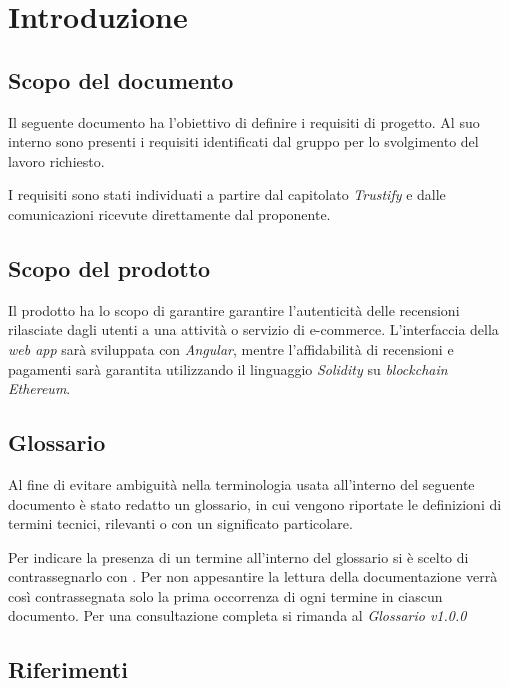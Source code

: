\section{Introduzione}


\subsection{Scopo del documento}
Il seguente documento ha l'obiettivo di definire i requisiti di progetto. Al suo interno sono presenti i requisiti
identificati dal gruppo \groupName\: per lo svolgimento del lavoro richiesto.

I requisiti sono stati individuati a partire dal capitolato \textit{Trustify}
e dalle comunicazioni ricevute direttamente dal proponente.

\subsection{Scopo del prodotto}
Il prodotto ha lo scopo di garantire garantire l'autenticità
delle recensioni rilasciate dagli utenti a una attività o servizio di e-commerce. L'interfaccia della \textit{web app}\glo\: sarà
sviluppata con \textit{Angular}\glo\:, mentre l'affidabilità di recensioni e pagamenti sarà garantita utilizzando il linguaggio \textit{Solidity}\glo\: su \textit{blockchain}\glo\: \textit{Ethereum}\glo\:.


\subsection{Glossario}
Al fine di evitare ambiguità nella terminologia usata all'interno del seguente
documento è stato redatto un glossario, in cui vengono riportate le definizioni
di termini tecnici, rilevanti o con un significato particolare.

Per indicare
la presenza di un termine all'interno del glossario si è scelto di
contrassegnarlo con \glo. Per non appesantire la lettura della documentazione
verrà così contrassegnata solo la prima occorrenza di ogni termine in ciascun
documento.
Per una consultazione completa si rimanda al \textit{Glossario v1.0.0}

\subsection{Riferimenti}
